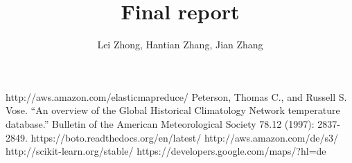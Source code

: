 \documentclass[a4paper]{article}
\begin{document}
\newtheorem{thm}{Theorem}
\newtheorem*{thm*}{Theorem}
\newtheorem{lem}{Lemma}
\newtheorem{cla}{Claim}
\newtheorem{prop}{Proposition}

\title{Final report}

\author{Lei Zhong, Hantian Zhang, Jian Zhang}
\date{}
\maketitle







%
%
\begin{thebibliography}{1}
     http://aws.amazon.com/elasticmapreduce/
     Peterson, Thomas C., and Russell S. Vose. ``An overview of the Global Historical Climatology Network temperature database.'' Bulletin of the American Meteorological Society 78.12 (1997): 2837-2849.
     https://boto.readthedocs.org/en/latest/
     http://aws.amazon.com/de/s3/
     http://scikit-learn.org/stable/
     https://developers.google.com/maps/?hl=de
\end{thebibliography}
\end{document}
